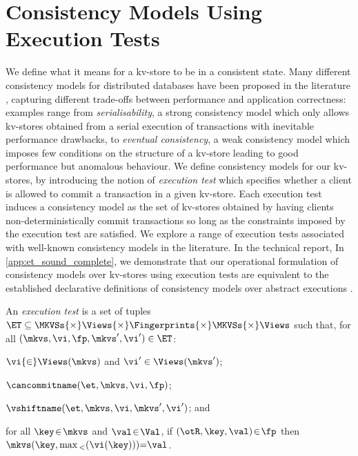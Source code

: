 \section{Consistency Models Using Execution Tests}
\label{sec:cm}
We define what it means for a kv-store 
to be in a consistent state. Many different consistency models for
distributed databases have 
been proposed in the literature
\cite{gdur,ramp,CORFU,tango,si,distrsi,clocksi,redblue,rola,cops,PSI-RA,NMSI,PSI,wren},
capturing different trade-offs 
between  performance and application
correctness: examples range from  \emph{serialisability}, a strong
consistency model which only allows kv-stores 
obtained  from a serial execution of transactions
with inevitable performance drawbacks, to  \emph{eventual consistency},  a weak consistency model
which imposes few conditions on the structure of a kv-store leading to
good performance but anomalous behaviour.
We define consistency models for our kv-stores,
by introducing the notion of 
\emph{execution test} which specifies  whether a client is allowed to commit a transaction in a given 
kv-store. Each execution test induces a consistency model as the set of kv-stores obtained 
by having clients non-deterministically commit transactions so long as  the constraints 
imposed by the execution test are satisfied.
We explore a range of execution tests  associated with well-known consistency models in the literature. 
\ifTechRepEdits%
In the technical report,
\else%
In \cref{app:et_sound_complete},
\fi
we demonstrate that our operational
formulation of  consistency models over kv-stores using execution
tests are  equivalent to the established declarative definitions of
consistency models over abstract executions \cite{ev_transactions,framework-concur}.

\SpaceAboveDef
\begin{definition}
\label{def:execution.test}
An \emph{execution test} is a set of tuples
\(\ET \subseteq \MKVSs {\times} \Views {\times} \allowbreak \Fingerprints {\times} \MKVSs {\times} \Views\) 
such that, for all \((\mkvs, \vi, \fp, \mkvs', \vi') \in \ET\): 
\begin{enumerate*}
	\item \(\vi {\in}  \allowbreak \Views(\mkvs)\) and \(\vi' \in \Views(\mkvs')\); 
	\item \(\cancommitname (\et,\mkvs, \vi, \fp)\); 
	\item \(\vshiftname (\et,\mkvs,{\allowbreak \vi},{\mkvs'},{\vi'})\); and 
	\item for all \(\key \!\in\! \mkvs\) and \(\val \!\in\! \Val\), if \((\otR, \key, \val) \!\in\! \fp \) then \(	\mkvs(\key, \max{}_{<}(\vi(\key))) {=} \val   \).
\end{enumerate*}
\end{definition}
\SpaceBelowDef

